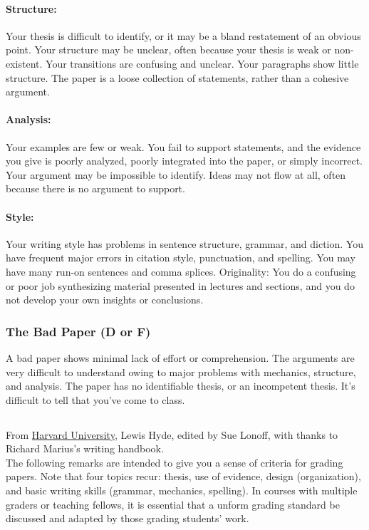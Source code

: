 \documentclass{article}
\begin{document}
\paragraph{Structure:} Your thesis is difficult to identify, or it may be a bland restatement of an obvious point. Your structure may be unclear, often because your thesis is weak or non-existent. Your transitions are confusing and unclear. Your paragraphs show little structure. The paper is a loose collection of statements, rather than a cohesive argument.
\paragraph{Analysis:} Your examples are few or weak. You fail to support statements, and the evidence you give is poorly analyzed, poorly integrated into the paper, or simply incorrect. Your argument may be impossible to identify. Ideas may not flow at all, often because there is no argument to support.
\paragraph{Style:} Your writing style has problems in sentence structure, grammar, and diction. You have frequent major errors in citation style, punctuation, and spelling. You may have many run-on sentences and comma splices.
Originality: You do a confusing or poor job synthesizing material presented in lectures and sections, and you do not develop your own insights or conclusions. 

\subsubsection{The Bad Paper (D or F)}
A bad paper shows minimal lack of effort or comprehension. The arguments are very difficult to understand owing to major problems with mechanics, structure, and analysis. The paper has no identifiable thesis, or an incompetent thesis. It’s difficult to tell that you’ve come to class.

\subsection{}
From \href{http://isites.harvard.edu/fs/html/icb.topic58474/GradingPapers.html}{Harvard University}, Lewis Hyde, edited by Sue Lonoff, with thanks to Richard Marius's writing handbook.\\
The following remarks are intended to give you a sense of criteria for grading papers. Note that four topics recur: thesis, use of evidence, design (organization), and basic writing skills (grammar, mechanics, spelling). In courses with multiple graders or teaching fellows, it is essential that a unform grading standard be discussed and adapted by those grading students' work.
\end{document}
